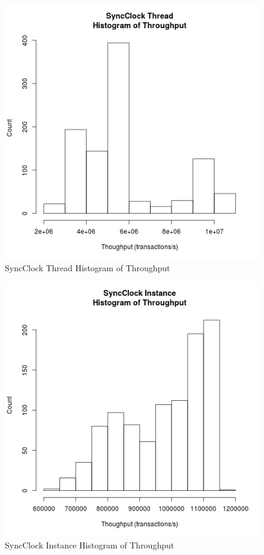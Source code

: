 \begin{figure}
\center
\includegraphics[height=.4\textheight]{sync_thread_throughput_hist.png}
\caption{SyncClock Thread Histogram of Throughput}
\label{sync_thread_throughput}
\end{figure}

\begin{figure}
\center
\includegraphics[height=.4\textheight]{sync_instance_throughput_hist.png}
\caption{SyncClock Instance Histogram of Throughput}
\label{sync_instance_throughput}
\end{figure}

